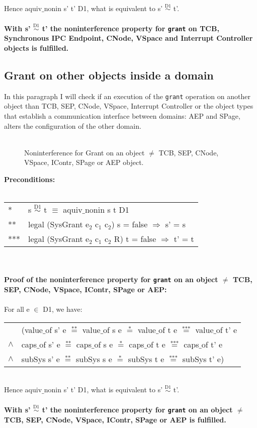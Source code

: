 Hence aquiv$\_$nonin s' t' D1, what is equivalent to s' $\overset{\text{D1}}{\sim}$ t'. \\ \\ 
\textbf{With s' $\overset{\text{D1}}{\sim}$ t' the noninterference property for \texttt{grant} on TCB, Synchronous IPC Endpoint, CNode, VSpace and Interrupt Controller objects is fulfilled.} 
\subsection{Grant on other objects inside a domain} 
In this paragraph I will check if an execution of the \texttt{grant} operation on another object than TCB, SEP, CNode, VSpace, Interrupt Controller or the object types that establish a communication interface between domains: AEP and SPage, alters the configuration of the other domain. \\ \\
\begin{figure}[H]
\caption{Noninterference for Grant on an object $\neq$ TCB, SEP, CNode, VSpace, IContr, SPage or AEP object.}
\end{figure}
\textbf{Preconditions:} \\ \\
\begin{tabular}{ll}
* & s $\overset{\text{D1}}{\sim}$ t $\equiv$ aquiv$\_$nonin s t D1	\\ 
** & legal (SysGrant e$_2$ c$_1$ c$_2$) s = false $\Rightarrow$ s' = s \\ 
*** & legal (SysGrant e$_2$ c$_1$ c$_2$ R) t = false $\Rightarrow$ t' = t
\end{tabular}\\ \\ 
\textbf{Proof of the noninterference property for \texttt{grant} on an object $\neq$ TCB, SEP, CNode, VSpace, IContr, SPage or AEP:}\\ \\
For all e $\in$ D1, we have: \\ 
\begin{tabular}{ll}
& (value$\_$of s' e $\overset{\text{**}}{=}$ value$\_$of s e $\overset{\text{*}}{=}$ value$\_$of t e $\overset{\text{***}}{=}$ value$\_$of t' e \\
$\wedge$ & caps$\_$of s' e $\overset{\text{**}}{=}$ caps$\_$of s e $\overset{\text{*}}{=}$ caps$\_$of t e $\overset{\text{***}}{=}$ caps$\_$of t' e \\
$\wedge$ & subSys s' e $\overset{\text{**}}{=}$ subSys s e $\overset{\text{*}}{=}$ subSys t e $\overset{\text{***}}{=}$ subSys t' e)
\end{tabular} \\
Hence aquiv$\_$nonin s' t' D1, what is equivalent to s' $\overset{\text{D1}}{\sim}$ t'. \\ \\ 
\textbf{With s' $\overset{\text{D1}}{\sim}$ t' the noninterference property for \texttt{grant} on an object $\neq$ TCB, SEP, CNode, VSpace, IContr, SPage or AEP is fulfilled.} 
